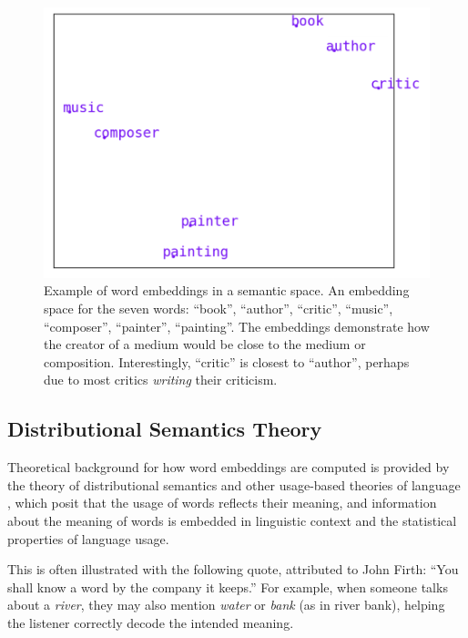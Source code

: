 \begin{figure}[h]
    \centering
    \includegraphics[scale=.5]{./images/Word_vector_demo.png}
    \caption[Generated using \url{http://vectors.nlpl.eu/explore/embeddings/en/}.]{Example of word embeddings in a semantic space. An embedding space for the seven words: ``book'', ``author'', ``critic'', ``music'', ``composer'', ``painter'', ``painting''. The embeddings demonstrate how the creator of a medium would be close to the medium or composition. Interestingly, ``critic'' is closest to ``author'', perhaps due to most critics \textit{writing} their criticism.}
 \label{f:writerPainterExample}
\end{figure}

 
\subsection{Distributional Semantics Theory}

Theoretical background for how word embeddings are computed is provided by the theory of distributional semantics \cite{harris1954distributional, firth1957synopsis} and other usage-based theories of language \cite{wittgenstein1953philosophical}, which posit that the usage of words reflects their meaning, and information about the meaning of words is embedded in linguistic context and the statistical properties of language usage.

This is often illustrated with the following quote, attributed to John Firth: ``You shall know a word by the company it keeps.'' For example, when someone talks about a \textit{river}, they may also mention \textit{water} or \textit{bank} (as in river bank), helping the listener correctly decode the intended meaning.

